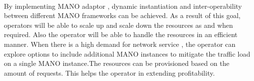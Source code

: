 \paragraph{}
By implementing MANO adaptor , dynamic instantiation and inter-operability between different MANO frameworks 
can be achieved. As a result of this goal, operators will be able to scale up and scale down the resources as and when required. Also the operator will be able to handle the resources in an efficient manner. 
When there is a high demand for network service , the operator can explore options to include additional MANO instances to mitigate the traffic load on a single MANO instance.The resources can be provisioned based on the amount of requests. This helps the operator in extending profitability. 
























